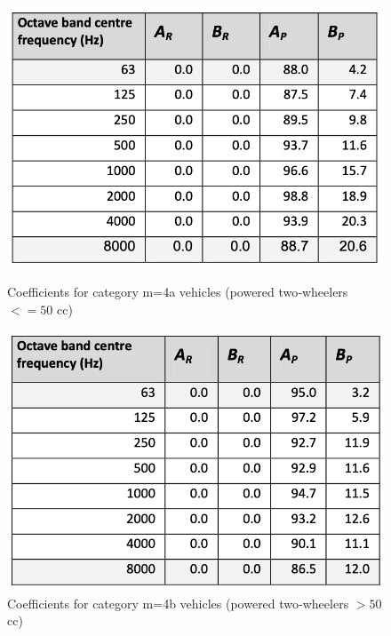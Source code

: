 \documentclass{article}
\begin{document}
\begin{figure}[H]
    \begin{minipage}[c]{.46\linewidth}
        \centering
        \includegraphics[width=1.1\textwidth]{CNOSSOS/Coefficients for category m=4a vehicles (powered two‐wheelers ≤ 50 cc).png}
        \caption{Coefficients for category m=4a vehicles (powered two‐wheelers $<= 50$ cc)}
    \end{minipage}
    \hfill%
    \begin{minipage}[c]{.46\linewidth}
        \centering
        \includegraphics[width=1.1\textwidth]{CNOSSOS/Coefficients for category m=4b vehicles (powered two‐wheelers > 50 cc).png}
        \caption{Coefficients for category m=4b vehicles (powered two‐wheelers $> 50$ cc)}
    \end{minipage}
\end{figure}
\end{document}
